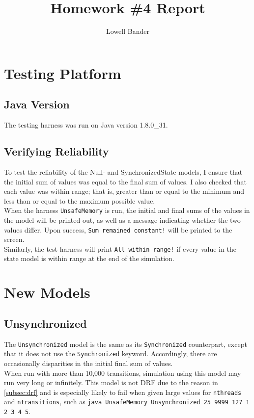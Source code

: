 \documentclass[]{article}
\begin{document}
\title{Homework \#4 Report}
\author{Lowell Bander}
\maketitle

\section{Testing Platform}
\subsection{Java Version}
The testing harness was run on Java version 1.8.0\_31.\\
\subsection{Verifying Reliability}
To test the reliability of the Null- and SynchronizedState models, I ensure that the initial sum of values was equal to the final sum of values. I also checked that each value was within range; that is, greater than or equal to the minimum and less than or equal to the maximum possible value.\\

When the harness \texttt{UnsafeMemory} is run, the initial and final sums of the values in the model will be printed out, as well as a message indicating whether the two values differ. Upon success, \texttt{Sum remained constant!} will be printed to the screen.\\

Similarly, the test harness will print \texttt{All within range!} if every value in the state model is within range at the end of the simulation.
\section{New Models}
\subsection{Unsynchronized}
\label{sec:unsync}
The \texttt{Unsynchronized} model is the same as its \texttt{Synchronized} counterpart, except that it does not use the \texttt{Synchronized} keyword. Accordingly, there are occasionally disparities in the initial final sum of values.\\

When run with more than 10,000 transitions, simulation using this model may run very long or infinitely. This model is not DRF due to the reason in \cref{subsec:drf} and is especially likely to fail when given large values for \texttt{nthreads} and \texttt{ntransitions}, such as \texttt{java UnsafeMemory Unsynchronized 25 9999 127 1 2 3 4 5}. 
\end{document}
